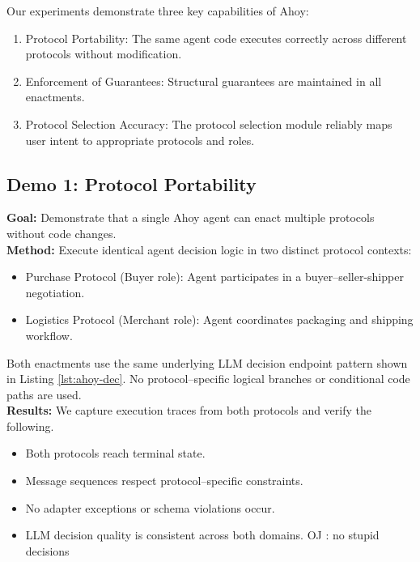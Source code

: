 \documentclass[runningheads]{llncs}
\newcounter{ojcount}
\newcommand{\oj}[1]{\stepcounter{ojcount}\textcolor{green!60!black}{\textsf{OJ \theojcount: #1}\newline}}
\newcommand{\ahoy}{Ahoy\xspace}
\begin{document}

Our experiments demonstrate three key capabilities of \ahoy:
\begin{enumerate}
    \item Protocol Portability: The same agent code executes correctly across different protocols without modification.
    \item Enforcement of Guarantees: Structural guarantees are maintained in all enactments.
    \item Protocol Selection Accuracy: The protocol selection module reliably maps user intent to appropriate protocols and roles.
\end{enumerate}

\subsection{Demo 1: Protocol Portability}
\textbf{Goal:} Demonstrate that a single \ahoy agent can enact multiple protocols without code changes.\\
\textbf{Method:} Execute identical agent decision logic in two distinct protocol contexts:
\begin{itemize}
    \item Purchase Protocol (Buyer role): Agent participates in a buyer--seller-shipper negotiation.
    \item Logistics Protocol (Merchant role): Agent coordinates packaging and shipping workflow.
\end{itemize}
Both enactments use the same underlying LLM decision endpoint pattern shown in Listing \ref{lst:ahoy-dec}.
No protocol--specific logical branches or conditional code paths are used.\\
\textbf{Results:} We capture execution traces from both protocols and verify the following.
\begin{itemize}
    \item Both protocols reach terminal state.
    \item Message sequences respect protocol--specific constraints.
    \item No adapter exceptions or schema violations occur.
    \item LLM decision quality is consistent across both domains. \oj{no stupid decisions}
\end{itemize}
\end{document}
